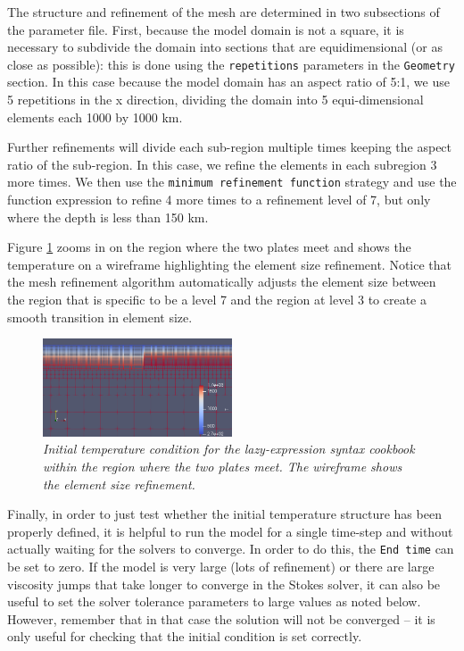 \documentclass{article}
\begin{document}
The structure and refinement of the mesh are determined in two subsections of the parameter file. First, because the model domain is not a square, it is necessary to subdivide the domain into sections that are equidimensional (or as close as possible): this is done using the \texttt{repetitions} parameters in the \texttt{Geometry} section. In this case because the model domain has an aspect ratio of 5:1, we use 5 repetitions in the x direction, dividing the domain into 5 equi-dimensional elements each 1000 by 1000 km.

Further refinements will divide each sub-region multiple times keeping the aspect ratio of the sub-region. In this case, we refine the elements in each subregion 3 more times. We then use the \texttt{minimum refinement function} strategy and use the function expression to refine 4 more times to a refinement level of 7, but only where the depth is less than 150 km.

Figure \ref{lazy-expression-tempic-zoom} zooms in on the region where the two plates meet and shows the temperature on a wireframe highlighting the element size refinement. Notice that the mesh refinement algorithm automatically adjusts the element size between the region that is specific to be a level 7 and the region at level 3 to create a smooth transition in element size.
\begin{figure}
\centering
\includegraphics[width=0.5\textwidth]{cookbooks/muparser-temperature-example/initial_temperature_on_mesh_zoom.png}
\caption{\it Initial temperature condition for the lazy-expression syntax cookbook within the region where the two plates meet. The wireframe shows the element size refinement. \label{lazy-expression-tempic-zoom}}
\end{figure}

Finally, in order to just test whether the initial temperature structure has been properly defined, it is helpful to run the model for a single time-step and without actually waiting for the solvers to converge. In order to do this, the \texttt{End time} can be set to zero. If the model is very large (lots of refinement) or there are large viscosity jumps that take longer to converge in the Stokes solver, it can also be useful to set the solver tolerance parameters to large values as noted below. However, remember that in that case the solution will not be converged -- it is only useful for checking that the initial condition is set correctly.

\end{document}
